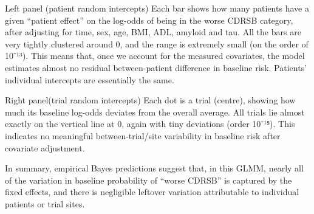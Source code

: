 \documentclass[
  11pt,
  letterpaper,
  DIV=11,
  numbers=noendperiod]{scrartcl}
\begin{document}
\begin{table}
\caption{Subjects with Lowest Random Intercepts (Low Risk)}\tabularnewline

\centering\begingroup\fontsize{9}{11}\selectfont

\endgroup{}
\end{table}

Left panel (patient random intercepts) Each bar shows how many patients
have a given ``patient effect'' on the log-odds of being in the worse
CDRSB category, after adjusting for time, sex, age, BMI, ADL, amyloid
and tau. All the bars are very tightly clustered around 0, and the range
is extremely small (on the order of 10⁻¹³). This means that, once we
account for the measured covariates, the model estimates almost no
residual between-patient difference in baseline risk. Patients'
individual intercepts are essentially the same.

Right panel(trial random intercepts) Each dot is a trial (centre),
showing how much its baseline log-odds deviates from the overall
average. All trials lie almost exactly on the vertical line at 0, again
with tiny deviations (order 10⁻¹⁵). This indicates no meaningful
between-trial/site variability in baseline risk after covariate
adjustment.

In summary, empirical Bayes predictions suggest that, in this GLMM,
nearly all of the variation in baseline probability of ``worse CDRSB''
is captured by the fixed effects, and there is negligible leftover
variation attributable to individual patients or trial sites.
\end{document}
